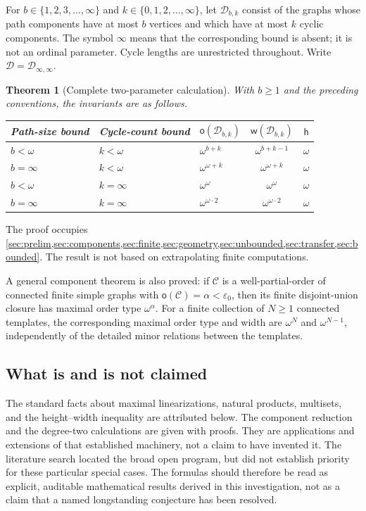 \documentclass[11pt,letterpaper]{article}
\theoremstyle{plain}
\newtheorem{theorem}{Theorem}[section]
\theoremstyle{definition}
\theoremstyle{remark}
\newcommand{\mot}{\mathsf o}
\newcommand{\wid}{\mathsf w}
\newcommand{\hei}{\mathsf h}
\newcommand{\Cl}{\mathcal C}
\newcommand{\DG}{\mathcal D}
\newcommand{\Inf}{\infty}
\newcommand{\eps}{\varepsilon}
\begin{document}
For $b\in\{1,2,3,\ldots,\Inf\}$ and
$k\in\{0,1,2,\ldots,\Inf\}$, let $\DG_{b,k}$ consist of the graphs whose
path components have at most $b$ vertices and which have at most $k$
cyclic components. The symbol $\Inf$ means that the corresponding bound is
absent; it is not an ordinal parameter. Cycle lengths are unrestricted
throughout. Write $\DG=\DG_{\Inf,\Inf}$.

\begin{theorem}[Complete two-parameter calculation]\label{thm:table}
With $b\ge1$ and the preceding conventions, the invariants are as follows.
\begin{center}
\normalfont\small
\renewcommand{\arraystretch}{1.35}
\begin{tabular}{@{}lllcc@{}}
\toprule
Path-size bound & Cycle-count bound & $\mot(\DG_{b,k})$ & $\wid(\DG_{b,k})$ & $\hei$\\
\midrule
$b<\omega$ & $k<\omega$ & $\omega^{b+k}$ & $\omega^{b+k-1}$ & $\omega$\\
$b=\Inf$ & $k<\omega$ & $\omega^{\omega+k}$ & $\omega^{\omega+k}$ & $\omega$\\
$b<\omega$ & $k=\Inf$ & $\omega^\omega$ & $\omega^\omega$ & $\omega$\\
$b=\Inf$ & $k=\Inf$ & $\omega^{\omega\cdot2}$ & $\omega^{\omega\cdot2}$ & $\omega$\\
\bottomrule
\end{tabular}
\end{center}
\end{theorem}

The proof occupies \cref{sec:prelim,sec:components,sec:finite,sec:geometry,sec:unbounded,sec:transfer,sec:bounded}.
The result is not based on extrapolating finite computations.

A general component theorem is also proved: if $\Cl$ is a well-partial-order
of connected finite simple graphs with $\mot(\Cl)=\alpha<\eps_0$, then its
finite disjoint-union closure has maximal order type $\omega^\alpha$.
For a finite collection of $N\ge1$ connected templates, the corresponding
maximal order type and width are $\omega^N$ and $\omega^{N-1}$,
independently of the detailed minor relations between the templates.

\subsection{What is and is not claimed}

The standard facts about maximal linearizations, natural products,
multisets, and the height--width inequality are attributed below. The
component reduction and the degree-two calculations are given with proofs.
They are applications and extensions of that established machinery, not a
claim to have invented it. The literature search located the broad open
program, but did not establish priority for these particular special cases.
The formulas should therefore be read as explicit, auditable mathematical
results derived in this investigation, not as a claim that a named
longstanding conjecture has been resolved.
\end{document}
